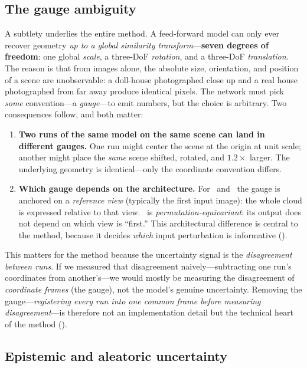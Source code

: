 \subsection{The gauge ambiguity}
\label{sec:primer-gauge}

A subtlety underlies the entire method. A feed-forward model can only ever recover
geometry \emph{up to a global similarity transform}---\textbf{seven degrees of freedom}: one global
\emph{scale}, a three-DoF \emph{rotation}, and a three-DoF \emph{translation}. The reason is that
from images alone, the absolute size, orientation, and position of a scene are unobservable: a
doll-house photographed close up and a real house photographed from far away produce identical
pixels. The network must pick \emph{some} convention---a \emph{gauge}---to emit numbers, but the
choice is arbitrary. Two consequences follow, and both matter:

\begin{enumerate}[leftmargin=1.4em,itemsep=2pt,topsep=2pt]
\item \textbf{Two runs of the same model on the same scene can land in different gauges.} One run
might center the scene at the origin at unit scale; another might place the \emph{same} scene
shifted, rotated, and $1.2\times$ larger. The underlying geometry is identical---only the coordinate
convention differs.
\item \textbf{Which gauge depends on the architecture.} For \vggt\ and \mastr\ the gauge is anchored
on a \emph{reference view} (typically the first input image): the whole cloud is expressed relative
to that view. \pii\ is \emph{permutation-equivariant}: its output does not depend on which view is
``first.'' This architectural difference is central to the method, because it decides \emph{which}
input perturbation is informative ().
\end{enumerate}

This matters for the method because the uncertainty signal is the \emph{disagreement between runs}. If we
measured that disagreement naively---subtracting one run's coordinates from another's---we would
mostly be measuring the disagreement of \emph{coordinate frames} (the gauge), not the model's
genuine uncertainty. Removing the gauge---\emph{registering every run into one common frame before
measuring disagreement}---is therefore not an implementation detail but the technical heart of the
method ().

\subsection{Epistemic and aleatoric uncertainty}
\label{sec:primer-uncertainty}

